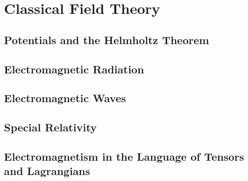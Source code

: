 \chapter{Classical Field Theory}
\section{Potentials and the Helmholtz Theorem}
\section{Electromagnetic Radiation}
\section{Electromagnetic Waves}
\section{Special Relativity}
\section{Electromagnetism in the Language of Tensors and Lagrangians}


